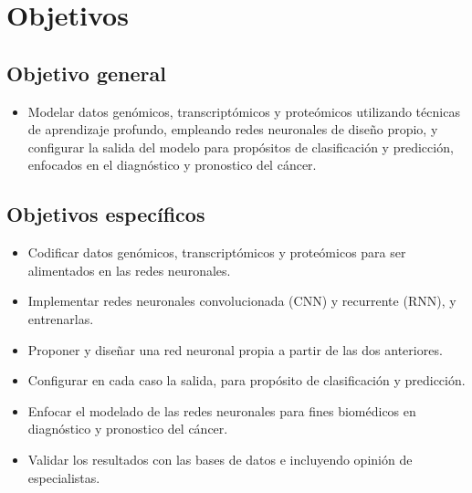 \section{Objetivos}

\subsection{Objetivo general}
\begin{itemize}

   \addtolength{\itemsep}{-4mm} %
        \item Modelar datos genómicos, transcriptómicos y proteómicos utilizando técnicas de aprendizaje profundo, empleando redes neuronales de diseño propio, y configurar la salida del modelo para propósitos de clasificación y predicción, enfocados en el diagnóstico y pronostico del cáncer.

    \end{itemize}


\subsection{Objetivos específicos}

\begin{itemize}

   \addtolength{\itemsep}{-4mm} %
        \item Codificar datos genómicos, transcriptómicos y proteómicos para ser alimentados en las redes neuronales.
        \item Implementar redes neuronales convolucionada (CNN) y recurrente (RNN), y entrenarlas.
        \item Proponer y diseñar una red neuronal propia a partir de las dos anteriores.
        \item Configurar en cada caso la salida, para propósito de clasificación y predicción.
        \item Enfocar el modelado de las redes neuronales para fines biomédicos en diagnóstico y pronostico del cáncer.
        \item Validar los resultados con las bases de datos e incluyendo opinión de especialistas.
    \end{itemize}